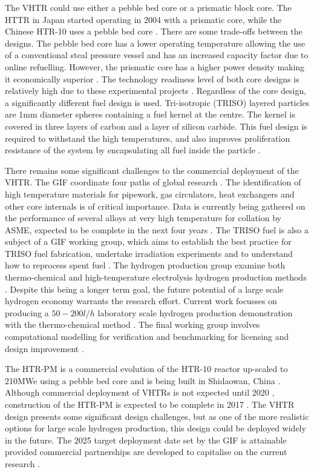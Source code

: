 \documentclass[journal]{IEEEtran}
\begin{document}
The VHTR could use either a pebble bed core or a prismatic block core.
The HTTR in Japan started operating in 2004 with a prismatic core, while the Chinese HTR-10 uses a pebble bed core \cite{Ftterer2014}.
There are some trade-offs between the designs.
The pebble bed core has a lower operating temperature allowing the use of a conventional steal pressure vessel and has an increased capacity factor due to online refuelling.
However, the prismatic core has a higher power density making it economically superior \cite{Locatelli2013}.
The technology readiness level of both core designs is relatively high due to these experimental projects \cite{Ftterer2014}.
Regardless of the core design, a significantly different fuel design is used.
Tri-isotropic (TRISO) layered particles are 1mm diameter spheres containing a fuel kernel at the centre.
The kernel is covered in three layers of carbon and a layer of silicon carbide.
This fuel design is required to withstand the high temperatures, and also improves proliferation resistance of the system by encapsulating all fuel inside the particle \cite{Marques2010a}.

There remains some significant challenges to the commercial deployment of the VHTR. 
The GIF coordinate four paths of global research \cite{GenIVForum}.
The identification of high temperature materials for pipework, gas circulators, heat exchangers and other core internals is of critical importance. 
Data is currently being gathered on the performance of several alloys at very high temperature for collation by ASME, expected to be complete in the next four years \cite{Ftterer2014}.
The TRISO fuel is also a subject of a GIF working group, which aims to establish the best practice for TRISO fuel fabrication, undertake irradiation experiments \cite{Ftterer2014} and to understand how to reprocess spent fuel \cite{GenIVForum}. 
The hydrogen production group examine both thermo-chemical and high-temperature electrolysis hydrogen production methods \cite{GenIVForum}.
Despite this being a longer term goal, the future potential of a large scale hydrogen economy warrants the research effort.
Current work focusses on producing a $50-200l/h$ laboratory scale hydrogen production demonstration with the thermo-chemical method \cite{Ftterer2014}.
The final working group involves computational modelling for verification and benchmarking for licensing and design improvement \cite{GenIVForum}.

The HTR-PM is a commercial evolution of the HTR-10 reactor up-scaled to 210MWe using a pebble bed core and is being built in Shidaowan, China \cite{Locatelli2013}.
Although commercial deployment of VHTRs is not expected until 2020 \cite{GenIVRoadmap}, construction of the HTR-PM is expected to be complete in 2017 \cite{Ftterer2014}. 
The VHTR design presents some significant design challenges, but as one of the more realistic options for large scale hydrogen production, this design could be deployed widely in the future.
The 2025 target deployment date set by the GIF \cite{GenIVRoadmap} is attainable provided commercial partnerships are developed to capitalise on the current research \cite{Ftterer2014}.
\end{document}

